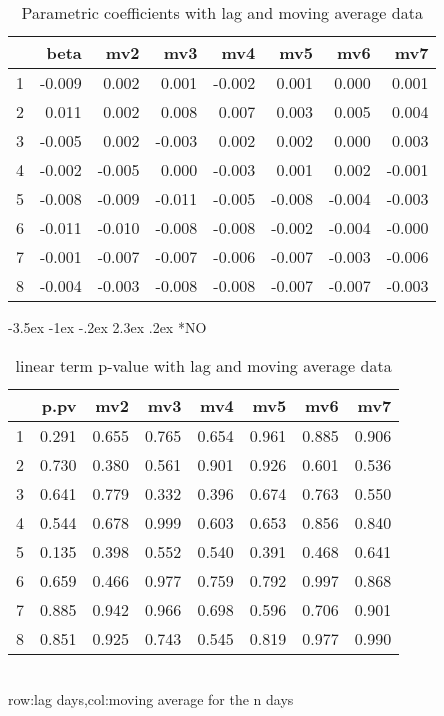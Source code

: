 \documentclass[a4paper, 12pt]{article}
\makeatletter
\def\large{\fontsize{14}{20}\selectfont}
\renewcommand\subsection{\@startsection {subsection}{1}{\z@}%
                                   {-3.5ex \@plus -1ex \@minus -.2ex}%
                                   {2.3ex \@plus.2ex}%
                                   {\centering\normalfont\large\bfseries}}
\makeatother
\begin{document}
\begin{table}[h]
\centering
\caption{Parametric coefficients with lag and moving average data}
\begin{tabular}{rrrrrrrr}
  \hline
 & beta & mv2 & mv3 & mv4 & mv5 & mv6 & mv7 \\
  \hline
1 & -0.009 & 0.002 & 0.001 & -0.002 & 0.001 & 0.000 & 0.001 \\
  2 & 0.011 & 0.002 & 0.008 & 0.007 & 0.003 & 0.005 & 0.004 \\
  3 & -0.005 & 0.002 & -0.003 & 0.002 & 0.002 & 0.000 & 0.003 \\
  4 & -0.002 & -0.005 & 0.000 & -0.003 & 0.001 & 0.002 & -0.001 \\
  5 & -0.008 & -0.009 & -0.011 & -0.005 & -0.008 & -0.004 & -0.003 \\
  6 & -0.011 & -0.010 & -0.008 & -0.008 & -0.002 & -0.004 & -0.000 \\
  7 & -0.001 & -0.007 & -0.007 & -0.006 & -0.007 & -0.003 & -0.006 \\
  8 & -0.004 & -0.003 & -0.008 & -0.008 & -0.007 & -0.007 & -0.003 \\
   \hline
\end{tabular}
\end{table}
\clearpage
\subsection*{NO}
\begin{table}[h]
\centering
\caption{linear term p-value with lag and moving average data}
\begin{tabular}{rrrrrrrr}
  \hline
 & p.pv & mv2 & mv3 & mv4 & mv5 & mv6 & mv7 \\
  \hline
1 & 0.291 & 0.655 & 0.765 & 0.654 & 0.961 & 0.885 & 0.906 \\
  2 & 0.730 & 0.380 & 0.561 & 0.901 & 0.926 & 0.601 & 0.536 \\
  3 & 0.641 & 0.779 & 0.332 & 0.396 & 0.674 & 0.763 & 0.550 \\
  4 & 0.544 & 0.678 & 0.999 & 0.603 & 0.653 & 0.856 & 0.840 \\
  5 & 0.135 & 0.398 & 0.552 & 0.540 & 0.391 & 0.468 & 0.641 \\
  6 & 0.659 & 0.466 & 0.977 & 0.759 & 0.792 & 0.997 & 0.868 \\
  7 & 0.885 & 0.942 & 0.966 & 0.698 & 0.596 & 0.706 & 0.901 \\
  8 & 0.851 & 0.925 & 0.743 & 0.545 & 0.819 & 0.977 & 0.990 \\
   \hline
\end{tabular}
\\row:lag days,col:moving average for the n days
\end{table}
\end{document}
